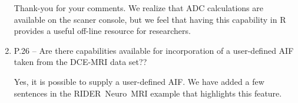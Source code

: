\documentclass[11pt]{article}
\begin{document}
\begin{enumerate}
  Thank-you for your comments.  We realize that ADC calculations are
  available on the scaner console, but we feel that having this
  capability in \textsf{R} provides a useful off-line resource for
  researchers.

\item P.26 – Are there capabilities available for incorporation of a
  user-defined AIF taken from the DCE-MRI data set??

  Yes, it is possible to supply a user-defined AIF.  We have added a
  few sentences in the RIDER~Neuro~MRI example that highlights this
  feature.

\end{enumerate}




\end{document}
